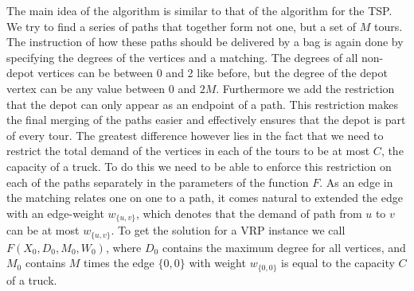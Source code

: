 \documentclass[titlepage, 12pt]{article}
\begin{document}
    The main idea of the algorithm is similar to that of the algorithm for the TSP\@. We try to find
    a series of paths that together form not one, but a set of $M$ tours. The instruction of how
    these paths should be delivered by a bag is again done by specifying the degrees of the vertices
    and a matching. The degrees of all non-depot vertices can be between 0 and 2 like before, but
    the degree of the depot vertex can be any value between 0 and $2M$. Furthermore we add the
    restriction that the depot can only appear as an endpoint of a path. This restriction makes the
    final merging of the paths easier and effectively ensures that the depot is part of every tour.
    The greatest difference however lies in the fact that we need to restrict the total demand of
    the vertices in each of the tours to be at most $C$, the capacity of a truck.
    To do this we need to be able to enforce this restriction on each of the paths separately in the
    parameters of the function $F$.
    As an edge in the matching relates one on one to a path, it comes natural to extended the edge
    with an edge-weight $w_{\{u, v\}}$, which denotes that the demand of path from $u$ to $v$ can be
    at most $w_{\{u, v\}}$.
    To get the solution for a VRP instance we call $F(X_0, D_0, M_0, W_0)$, where $D_0$ contains the
    maximum degree for all vertices, and $M_0$ contains $M$ times the edge $\{0, 0\}$ with weight
    $w_{\{0, 0\}}$ is equal to the capacity $C$ of a truck.
\end{document}
